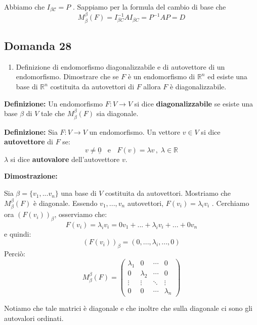 \documentclass[
  a4paper,
]{article}
\providecommand{\tightlist}{%
  \setlength{\itemsep}{0pt}\setlength{\parskip}{0pt}}
\providecommand{\tightlist}{}
\begin{document}
Abbiamo che \(I_{\beta \mathcal{C}} = P\) . Sappiamo per la formula del
cambio di base che \[
M^{{\beta}}_{\beta}(F) = I^{{-1}}_{\beta C}AI_{\beta C} = P^{-1}AP = D
\]

\hypertarget{domanda-28}{%
\subsection{Domanda 28}\label{domanda-28}}

\begin{observationbox}[Domanda]
\begin{enumerate}
\def\labelenumi{\arabic{enumi}.}
\setcounter{enumi}{27}
\tightlist
\item
  Definizione di endomorfismo diagonalizzabile e di autovettore di un
  endomorfismo. Dimostrare che se \(F\) è un endomorfismo di
  \(\mathbb{R}^n\) ed esiste una base di \(\mathbb{R}^n\) costituita da
  autovettori di \(F\) allora \(F\) è diagonalizzabile.
\end{enumerate}
\end{observationbox}

\textbf{Definizione:} Un endomorfismo \(F: V \to V\) si dice
\textbf{diagonalizzabile} se esiste una base \(\beta\) di \(V\) tale che
\(M^{{\beta}}_{\beta}(F)\) sia diagonale.

\textbf{Definizione:} Sia \(F: V \to V\) un endomorfismo. Un vettore
\(v \in V\) si dice \textbf{autovettore} di \(F\) se: \[
v \not = \underline{0} \;\;\text{ e }\;\; F(v) = \lambda v \,,\; \lambda \in \mathbb{R}
\] \(\lambda\) si dice \textbf{autovalore} dell'autovettore \(v\).

\textbf{Dimostrazione:}

Sia \(\beta = \{v_1, ... v_n\}\) una base di \(V\) costituita da
autovettori. Mostriamo che \(M^{{\beta}}_{\beta}(F)\) è diagonale.
Essendo \(v_1, ..., v_n\) autovettori, \(F(v_i) = \lambda_i v_i\) .
Cerchiamo ora \((F(v_i))_{\beta}\), osserviamo che: \[
F(v_i) = \lambda_i v_i = 0 v_1 + ... + \lambda_i v_i + ... + 0 v_n
\] e quindi: \[
(F(v_i))_{\beta} = (0 , ... , \lambda_i , ... , 0)
\] Perciò: \[
M^{{\beta}}_{\beta}(F) =
\begin{pmatrix}
\lambda_1 & 0 & \cdots & 0\\
0 & \lambda_2 & \cdots & 0\\
\vdots & \vdots & \ddots & \vdots\\
0 & 0 & \cdots & \lambda_n
\end{pmatrix}
\]

Notiamo che tale matrici è diagonale e che inoltre che sulla diagonale
ci sono gli autovalori ordinati.
\end{document}
